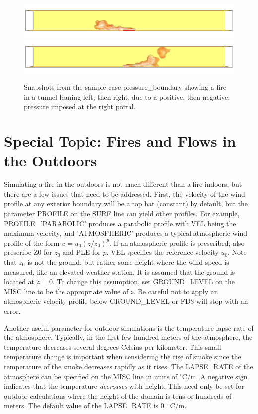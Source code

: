 \documentclass[11pt]{book}
\begin{document}
\begin{figure}[ht]
\includegraphics[width=\textwidth]{SCRIPT_FIGURES/pressure_boundary_left}
\includegraphics[width=\textwidth]{SCRIPT_FIGURES/pressure_boundary_right}
\caption[Snapshots of the {\ct pressure\_boundary} test case]{Snapshots from the sample case {\ct pressure\_boundary}
showing a fire in a tunnel leaning left, then right, due to a positive, then negative, pressure imposed at
the right portal.}
\label{pressure_boundary}
\end{figure}


\clearpage

\section{Special Topic: Fires and Flows in the Outdoors}
\label{info:stratification}

Simulating a fire in the outdoors is not much different than a fire
indoors, but there are a few issues that need to be addressed.
First, the velocity of the wind profile at any exterior boundary will be a top hat (constant) by default,
but the parameter {\ct PROFILE} on the {\ct SURF} line
can yield other profiles.
For example, {\ct PROFILE='PARABOLIC'} produces a parabolic profile with
{\ct VEL} being the maximum velocity,
and {\ct 'ATMOSPHERIC'} produces a typical atmospheric wind
profile of the form $u=u_0 (z/z_0)^p$. If an atmospheric profile is
prescribed, also prescribe {\ct Z0} for $z_0$  and {\ct PLE} for $p$.
{\ct VEL} specifies the reference velocity $u_0$. Note that $z_0$ is not the ground, but rather some
height where the wind speed is measured, like an elevated weather station. It is assumed that
the ground is located at $z=0$. To change this assumption, set {\ct GROUND\_LEVEL} on the {\ct MISC} line to be
the appropriate value of $z$. Be careful not to apply an atmospheric velocity profile below {\ct GROUND\_LEVEL} or
FDS will stop with an error.

Another useful parameter for outdoor simulations is the temperature
lapse rate of the atmosphere. Typically, in the first few hundred meters
of the atmosphere, the temperature decreases several degrees Celsius
per kilometer. This small temperature change is important when considering the rise
of smoke since the temperature of the smoke decreases rapidly as it
rises. The {\ct LAPSE\_RATE} of the atmosphere can be specified on the
{\ct MISC} line in units of $^\circ$C/m. A negative sign indicates that the
temperature {\em decreases} with height.
This need only be set for outdoor calculations where the height of the
domain is tens or hundreds of meters.
The default value of the {\ct LAPSE\_RATE} is 0~$^\circ$C/m.
\end{document}

